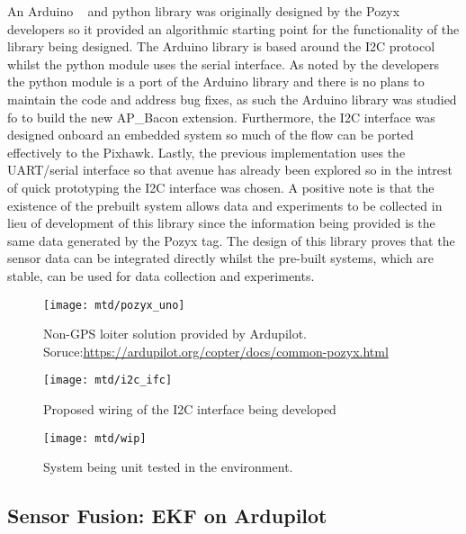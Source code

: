 An Arduino ~\cite{pozarduino} and python library was originally designed by the Pozyx developers so it provided an algorithmic starting point for the functionality of the library being designed.
The Arduino library is based around the I2C protocol whilst the python module uses the serial interface.
As noted by the developers the python module is a port of the Arduino library and there is no plans to maintain the code and address bug fixes, as such the Arduino library was studied fo to build the new AP\_Bacon extension.
Furthermore, the I2C interface was designed onboard an embedded system so much of the flow can be ported effectively to the Pixhawk.
Lastly, the previous implementation uses the UART/serial interface so that avenue has already been explored so in the intrest of quick prototyping the I2C interface was chosen.
A positive note is that the existence of the prebuilt system allows data and experiments to be collected in lieu of development of this library since the information being provided is the same data generated by the Pozyx tag.
The design of this library proves that the sensor data can be integrated directly whilst the pre-built systems, which are stable, can be used for data collection and experiments.
%


\begin{figure}[ht!]
    \centering
    \texttt{[image: mtd/pozyx\_uno]}
    \caption{Non-GPS loiter solution provided by Ardupilot. Soruce:\url{https://ardupilot.org/copter/docs/common-pozyx.html}}
\end{figure}

\begin{figure}[ht!]
    \centering
    \texttt{[image: mtd/i2c\_ifc]}
    \caption{Proposed wiring of the I2C interface being developed}
\end{figure}

\begin{figure}[ht!]
    \centering
    \texttt{[image: mtd/wip]}
    \caption{System being unit tested in the environment.}
\end{figure}
\newpage
\subsection{Sensor Fusion: EKF on Ardupilot}\label{subsec:sensor-fusion}
\lipsum[2-6]